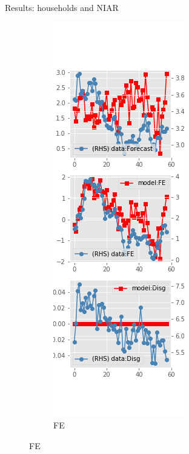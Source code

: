 \documentclass{beamer}
\begin{document}
\begin{frame}{Results: households and NIAR}
\begin{figure}[ht]
\begin{subfigure}[b]{0.19\textwidth}
		\end{subfigure}
		\hfill
		\begin{subfigure}[b]{0.19\textwidth}
			\caption{FE}
			\includegraphics[width=\textwidth, height = 0.8\textheight]{figuresDraft/sce_ni_est_diag1.png}

\end{subfigure}
\end{figure}
\end{frame}
\end{document}
